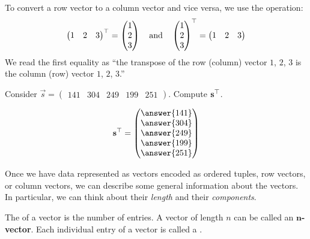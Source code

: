 \documentclass{ximera}
\begin{document}
\begin{definition}
  To convert a row vector to a column vector and vice versa, we use
  the  operation:
  \[
  \begin{pmatrix} 1 &  2 & 3 \end{pmatrix}^\top =
  \begin{pmatrix} 1 \\ 2 \\ 3 \end{pmatrix}
  \quad\text{and}\quad
  \begin{pmatrix} 1 \\ 2 \\ 3 \end{pmatrix}^\top =
  \begin{pmatrix} 1 &  2 & 3 \end{pmatrix}
  \]
  We read the first equality as ``the transpose of the row (column) vector $1$,
  $2$, $3$ is the column (row) vector $1$, $2$, $3$.''
\end{definition}


\begin{question}
  Consider $\vec{s} = \begin{pmatrix}141 & 304 & 249 & 199 & 251 \end{pmatrix}$. Compute $\mathbf{s}^\top$.
  \begin{prompt}
  \[
  \vec{s}^\transpose  = \begin{pmatrix}\answer{141} \\ \answer{304} \\ \answer{249} \\ \answer{199} \\ \answer{251} \end{pmatrix}
  \]
  \end{prompt}
\end{question}

Once we have data represented as vectors encoded as ordered tuples,
row vectors, or column vectors, we can describe some general
information about the vectors. In particular, we can think about their
\textit{length} and their \textit{components}.

\begin{definition}
The  of a vector is the number of entries.  A vector of
length $n$ can be called an $\boldsymbol n$\textbf{-vector}. Each
individual entry of a vector is called a .
\end{definition}
\end{document}
